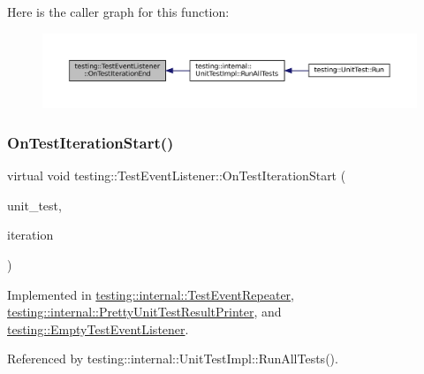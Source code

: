 Here is the caller graph for this function\+:
\nopagebreak
\begin{figure}[H]
\begin{center}
\leavevmode
\includegraphics[width=350pt]{classtesting_1_1TestEventListener_a550fdb3e55726e4cefa09f5697941425_icgraph}
\end{center}
\end{figure}
\mbox{\label{classtesting_1_1TestEventListener_a60cc09b7907cb329d152eb5e7133bdeb}} 
\subsubsection{\texorpdfstring{On\+Test\+Iteration\+Start()}{OnTestIterationStart()}}
{\footnotesize\ttfamily virtual void testing\+::\+Test\+Event\+Listener\+::\+On\+Test\+Iteration\+Start (\begin{DoxyParamCaption}\item[{const \hyperlink{classtesting_1_1UnitTest}{Unit\+Test} \&}]{unit\+\_\+test,  }\item[{int}]{iteration }\end{DoxyParamCaption})\hspace{0.3cm}{\ttfamily [pure virtual]}}



Implemented in \hyperlink{classtesting_1_1internal_1_1TestEventRepeater_a4062b3f070bb6531ab8494c13d3635d3}{testing\+::internal\+::\+Test\+Event\+Repeater}, \hyperlink{classtesting_1_1internal_1_1PrettyUnitTestResultPrinter_abdba10a8c97e272ab4cee97cb652c957}{testing\+::internal\+::\+Pretty\+Unit\+Test\+Result\+Printer}, and \hyperlink{classtesting_1_1EmptyTestEventListener_a836f05829855dc60d13ba99ad712c0dd}{testing\+::\+Empty\+Test\+Event\+Listener}.



Referenced by testing\+::internal\+::\+Unit\+Test\+Impl\+::\+Run\+All\+Tests().

